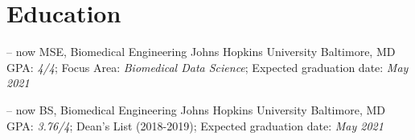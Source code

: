 \section{Education}

\cventry
{-- now}
{MSE, Biomedical Engineering}
{Johns Hopkins University}
{Baltimore, MD}
{}
{
GPA: \textit{4/4}; 
Focus Area: \textit{Biomedical Data Science}; 
Expected graduation date: \textit{May 2021}
}

\cventry
{-- now}
{BS, Biomedical Engineering}
{Johns Hopkins University}
{Baltimore, MD}
{}
{
GPA: \textit{3.76/4}; 
Dean's List (2018-2019);
{Expected graduation date:} \textit{May 2021}
}
